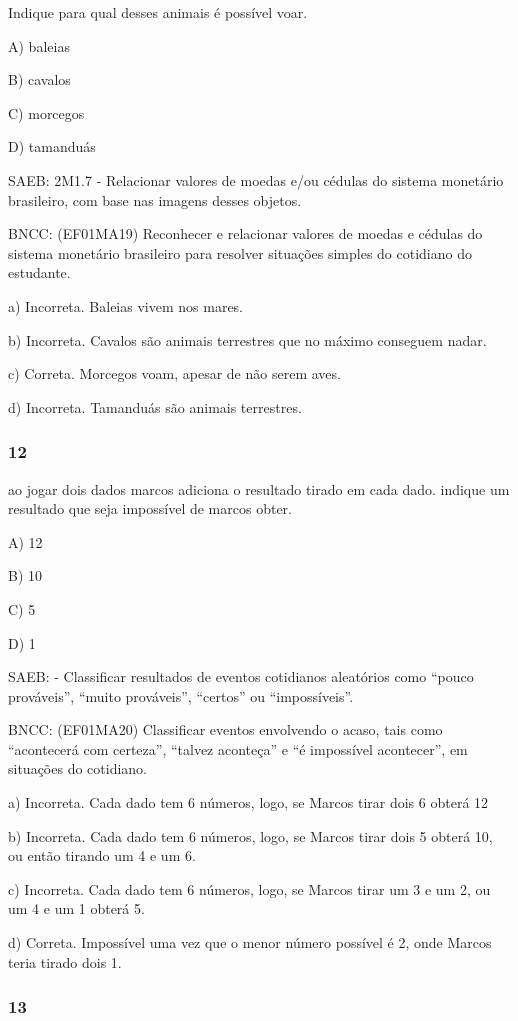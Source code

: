 \begin{itemize}
\begin{itemize}
Indique para qual desses animais é possível voar.

A) baleias

B) cavalos

C) morcegos

D) tamanduás

SAEB: 2M1.7 - Relacionar valores de moedas e/ou cédulas do sistema
monetário brasileiro, com base nas imagens desses objetos.

BNCC: (EF01MA19) Reconhecer e relacionar valores de moedas e cédulas do
sistema monetário brasileiro para resolver situações simples do
cotidiano do estudante.

a) Incorreta. Baleias vivem nos mares.

b) Incorreta. Cavalos são animais terrestres que no máximo conseguem
nadar.

c) Correta. Morcegos voam, apesar de não serem aves.

d) Incorreta. Tamanduás são animais terrestres.

\subsubsection{12}\label{section-143}

ao jogar dois dados marcos adiciona o resultado tirado em cada dado.
indique um resultado que seja impossível de marcos obter.

A) 12

B) 10

C) 5

D) 1

SAEB: - Classificar resultados de eventos cotidianos aleatórios como
``pouco prováveis'', ``muito prováveis'', ``certos'' ou ``impossíveis''.

BNCC: (EF01MA20) Classificar eventos envolvendo o acaso, tais como
``acontecerá com certeza'', ``talvez aconteça'' e ``é impossível
acontecer'', em situações do cotidiano.

a) Incorreta. Cada dado tem 6 números, logo, se Marcos tirar dois 6
obterá 12

b) Incorreta. Cada dado tem 6 números, logo, se Marcos tirar dois 5
obterá 10, ou então tirando um 4 e um 6.

c) Incorreta. Cada dado tem 6 números, logo, se Marcos tirar um 3 e um
2, ou um 4 e um 1 obterá 5.

d) Correta. Impossível uma vez que o menor número possível é 2, onde
Marcos teria tirado dois 1.

\subsubsection{13}\label{section-144}


\end{itemize}
\end{itemize}

